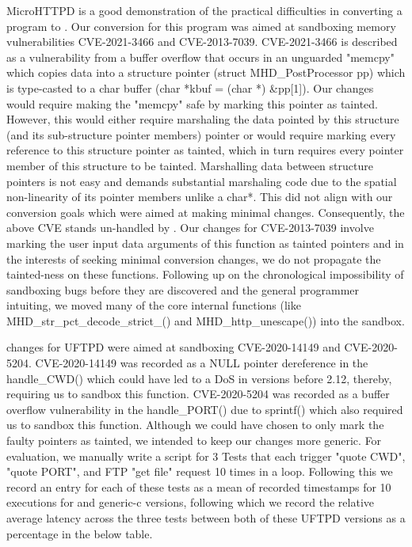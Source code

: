 MicroHTTPD is a good demonstration of the practical difficulties in converting a program to \systemname. Our conversion for this program was aimed at sandboxing memory vulnerabilities CVE-2021-3466 and CVE-2013-7039. CVE-2021-3466 is described as a vulnerability from a buffer overflow that occurs in an unguarded "memcpy" which copies data into a structure pointer (struct MHD\_PostProcessor pp) which is type-casted to a char buffer (char *kbuf = (char *) \&pp[1]). Our changes would require making the "memcpy" safe by marking this pointer as tainted. However, this would either require marshaling the data pointed by this structure (and its sub-structure pointer members) pointer or would require marking every reference to this structure pointer as tainted, which in turn requires every pointer member of this structure to be tainted. Marshalling data between structure pointers is not easy and demands substantial marshaling code due to the spatial non-linearity of its pointer members unlike a char*. This did not align with our conversion goals which were aimed at making minimal changes. Consequently, the above CVE stands un-handled by \systemname.  Our changes for CVE-2013-7039 involve marking the user input data arguments of this function as tainted pointers and in the interests of seeking minimal conversion changes, we do not propagate the tainted-ness on these functions. Following up on the chronological impossibility of sandboxing bugs before they are discovered and the general programmer intuiting, we moved many of the core internal functions (like MHD\_str\_pct\_decode\_strict\_() and MHD\_http\_unescape()) into the sandbox. 

\systemname changes for UFTPD were aimed at sandboxing CVE-2020-14149 and CVE-2020-5204. CVE-2020-14149 was recorded as a NULL pointer dereference in the handle\_CWD() which could have led to a DoS in versions before 2.12, thereby, requiring us to sandbox this function. CVE-2020-5204 was recorded as a buffer overflow vulnerability in the handle\_PORT() due to sprintf() which also required us to sandbox this function. Although we could have chosen to only mark the faulty pointers as tainted, we intended to keep our changes more generic. For evaluation, we manually write a script for 3 Tests that each trigger "quote CWD", "quote PORT", and FTP "get file" request 10 times in a loop. Following this we record an entry for each of these tests as a mean of recorded timestamps for 10 executions for \systemname and generic-c versions, following which we record the relative average latency across the three tests between both of these UFTPD versions as a percentage in the below table.   

